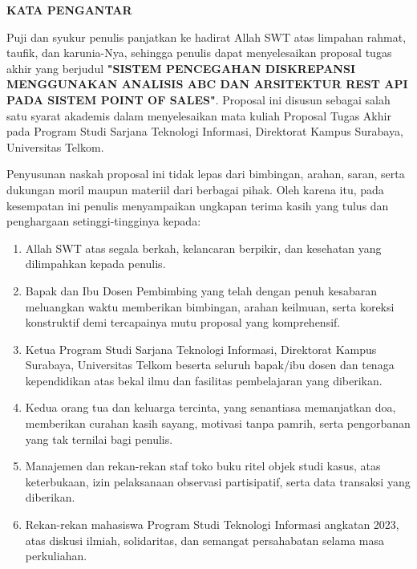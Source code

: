 \documentclass[11pt, a4paper]{article}
\begin{document}
\newpage
{}
\begin{center}
    {\large \textbf{KATA PENGANTAR}\par}
\end{center}
\vspace{0.6cm}

Puji dan syukur penulis panjatkan ke hadirat Allah SWT atas limpahan rahmat, taufik, dan karunia-Nya, sehingga penulis dapat menyelesaikan proposal tugas akhir yang berjudul \textbf{"SISTEM PENCEGAHAN DISKREPANSI MENGGUNAKAN ANALISIS ABC DAN ARSITEKTUR REST API PADA SISTEM POINT OF SALES"}. Proposal ini disusun sebagai salah satu syarat akademis dalam menyelesaikan mata kuliah Proposal Tugas Akhir pada Program Studi Sarjana Teknologi Informasi, Direktorat Kampus Surabaya, Universitas Telkom.

Penyusunan naskah proposal ini tidak lepas dari bimbingan, arahan, saran, serta dukungan moril maupun materiil dari berbagai pihak. Oleh karena itu, pada kesempatan ini penulis menyampaikan ungkapan terima kasih yang tulus dan penghargaan setinggi-tingginya kepada:
\begin{enumerate}[label=\arabic*.]
    \item Allah SWT atas segala berkah, kelancaran berpikir, dan kesehatan yang dilimpahkan kepada penulis.
    \item Bapak dan Ibu Dosen Pembimbing yang telah dengan penuh kesabaran meluangkan waktu memberikan bimbingan, arahan keilmuan, serta koreksi konstruktif demi tercapainya mutu proposal yang komprehensif.
    \item Ketua Program Studi Sarjana Teknologi Informasi, Direktorat Kampus Surabaya, Universitas Telkom beserta seluruh bapak/ibu dosen dan tenaga kependidikan atas bekal ilmu dan fasilitas pembelajaran yang diberikan.
    \item Kedua orang tua dan keluarga tercinta, yang senantiasa memanjatkan doa, memberikan curahan kasih sayang, motivasi tanpa pamrih, serta pengorbanan yang tak ternilai bagi penulis.
    \item Manajemen dan rekan-rekan staf toko buku ritel objek studi kasus, atas keterbukaan, izin pelaksanaan observasi partisipatif, serta data transaksi yang diberikan.
    \item Rekan-rekan mahasiswa Program Studi Teknologi Informasi angkatan 2023, atas diskusi ilmiah, solidaritas, dan semangat persahabatan selama masa perkuliahan.
\end{enumerate}
\end{document}
